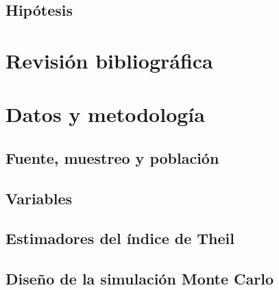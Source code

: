 \documentclass[12pt,letterpaper]{article}
\begin{document}
\subsection{Hipótesis}

\section{Revisión bibliográfica}

\section{Datos y metodología}

\subsection{Fuente, muestreo y población}

\subsection{Variables}

\subsection{Estimadores del índice de Theil}

\subsection{Diseño de la simulación Monte Carlo}
\end{document}
